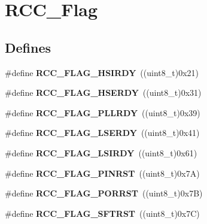 \hypertarget{group__RCC__Flag}{
\section{RCC\_\-Flag}
\label{group__RCC__Flag}
}
\subsection*{Defines}
\begin{DoxyCompactItemize}
\item 
\hypertarget{group__RCC__Flag_ga827d986723e7ce652fa733bb8184d216}{
\#define {\bfseries RCC\_\-FLAG\_\-HSIRDY}~((uint8\_\-t)0x21)}
\label{group__RCC__Flag_ga827d986723e7ce652fa733bb8184d216}

\item 
\hypertarget{group__RCC__Flag_ga173edf47bec93cf269a0e8d0fec9997c}{
\#define {\bfseries RCC\_\-FLAG\_\-HSERDY}~((uint8\_\-t)0x31)}
\label{group__RCC__Flag_ga173edf47bec93cf269a0e8d0fec9997c}

\item 
\hypertarget{group__RCC__Flag_gaf82d8afb18d9df75db1d6c08b9c50046}{
\#define {\bfseries RCC\_\-FLAG\_\-PLLRDY}~((uint8\_\-t)0x39)}
\label{group__RCC__Flag_gaf82d8afb18d9df75db1d6c08b9c50046}

\item 
\hypertarget{group__RCC__Flag_gac9fb963db446c16e46a18908f7fe1927}{
\#define {\bfseries RCC\_\-FLAG\_\-LSERDY}~((uint8\_\-t)0x41)}
\label{group__RCC__Flag_gac9fb963db446c16e46a18908f7fe1927}

\item 
\hypertarget{group__RCC__Flag_ga8c5e4992314d347597621bfe7ab10d72}{
\#define {\bfseries RCC\_\-FLAG\_\-LSIRDY}~((uint8\_\-t)0x61)}
\label{group__RCC__Flag_ga8c5e4992314d347597621bfe7ab10d72}

\item 
\hypertarget{group__RCC__Flag_gabfc3ab5d4a8a94ec1c9f38794ce37ad6}{
\#define {\bfseries RCC\_\-FLAG\_\-PINRST}~((uint8\_\-t)0x7A)}
\label{group__RCC__Flag_gabfc3ab5d4a8a94ec1c9f38794ce37ad6}

\item 
\hypertarget{group__RCC__Flag_ga39ad309070f416720207eece5da7dc2c}{
\#define {\bfseries RCC\_\-FLAG\_\-PORRST}~((uint8\_\-t)0x7B)}
\label{group__RCC__Flag_ga39ad309070f416720207eece5da7dc2c}

\item 
\hypertarget{group__RCC__Flag_gaf7852615e9b19f0b2dbc8d08c7594b52}{
\#define {\bfseries RCC\_\-FLAG\_\-SFTRST}~((uint8\_\-t)0x7C)}
\label{group__RCC__Flag_gaf7852615e9b19f0b2dbc8d08c7594b52}


\end{DoxyCompactItemize}
